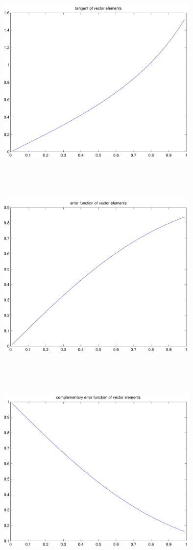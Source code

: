 \documentclass[9pt]{article}
\theoremstyle{plain}
\theoremstyle{definition}
\theoremstyle{remark}
\numberwithin{equation}{section}
\begin{document}
\includegraphics[width=10.0cm,height=10.0cm]{klVSLTan.pdf}

\includegraphics[width=10.0cm,height=10.0cm]{klVSLErf.pdf}

\includegraphics[width=10.0cm,height=10.0cm]{klVSLErfc.pdf}
\end{document}
